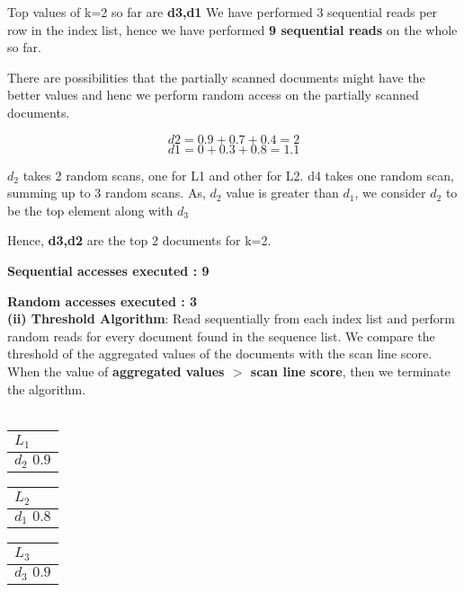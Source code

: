 Top values of k=2 so far are \textbf{d3,d1}
We have performed 3 sequential reads per row in the index list, hence we have performed \textbf{9 sequential reads} on the whole so far.

There are possibilities that the partially scanned documents might have the better values and henc we perform random access on the partially scanned documents.

\[d2 = 0.9 + 0.7 + 0.4 = 2 \]  
\[d1 = 0 + 0.3 + 0.8 = 1.1 \] 

$d_2$ takes 2 random scans, one for L1 and other for L2. d4 takes one random scan, summing up to 3 random scans.
As, $d_2$ value is greater than $d_1$, we consider $d_2$ to be the top element along with $d_3$
\newpage

Hence, \textbf{{d3,d2}} are the top 2 documents for k=2. 

\textbf{Sequential accesses executed : 9}

\textbf{Random accesses executed : 3}
\\

\textbf{(ii) Threshold Algorithm}:  Read sequentially from each index list and perform random reads for every document found in the sequence list. We compare the threshold of the aggregated values of the documents with the scan line score. When the value of \textbf{aggregated values $>$ scan line score}, then we terminate the algorithm.
\\
\\

\begin{center}
    \begin{minipage}[t]{2cm}
        \begin{tabular}{|p{25pt}|}\hline
          $L_1$\\\hline
          $d_2 \, \, 0.9$\\\hline
        \end{tabular}
    \end{minipage}
    \hspace{5mm}
    \begin{minipage}[t]{2cm}
        \begin{tabular}{|p{25pt}|}\hline
          $L_2$\\\hline
          $d_1 \, \, 0.8$\\\hline
            \end{tabular}
    \end{minipage}
    \hspace{5mm}
    \begin{minipage}[t]{2cm}
        \begin{tabular}{|p{25pt}|}\hline
        $L_3$\\\hline
        $d_3 \, \, 0.9$\\\hline      
        \end{tabular}
    \end{minipage}
    \end{center}
    
